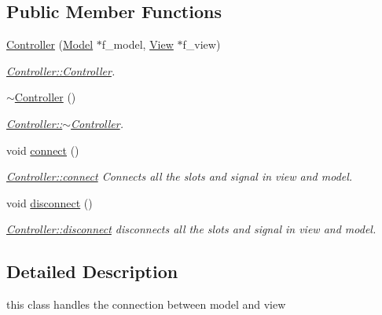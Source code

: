 \subsection*{Public Member Functions}
\begin{DoxyCompactItemize}
\item 
\hyperlink{class_controller_a7984f40669752a82c87e067bec6c3751}{Controller} (\hyperlink{class_model}{Model} $\ast$f\+\_\+model, \hyperlink{class_view}{View} $\ast$f\+\_\+view)
\begin{DoxyCompactList}\small\item\em \hyperlink{class_controller_a7984f40669752a82c87e067bec6c3751}{Controller\+::\+Controller}. \end{DoxyCompactList}\item 
\mbox{\label{class_controller_a0ab87934c4f7a266cfdb86e0f36bc1b5}} 
\hyperlink{class_controller_a0ab87934c4f7a266cfdb86e0f36bc1b5}{$\sim$\+Controller} ()
\begin{DoxyCompactList}\small\item\em \hyperlink{class_controller_a0ab87934c4f7a266cfdb86e0f36bc1b5}{Controller\+::$\sim$\+Controller}. \end{DoxyCompactList}\item 
\mbox{\label{class_controller_afe28638e4396e7b8415cbe5d05964ad2}} 
void \hyperlink{class_controller_afe28638e4396e7b8415cbe5d05964ad2}{connect} ()
\begin{DoxyCompactList}\small\item\em \hyperlink{class_controller_afe28638e4396e7b8415cbe5d05964ad2}{Controller\+::connect} Connects all the slots and signal in view and model. \end{DoxyCompactList}\item 
\mbox{\label{class_controller_a1b122dccfa346274aa2e6aa5e6a7eb01}} 
void \hyperlink{class_controller_a1b122dccfa346274aa2e6aa5e6a7eb01}{disconnect} ()
\begin{DoxyCompactList}\small\item\em \hyperlink{class_controller_a1b122dccfa346274aa2e6aa5e6a7eb01}{Controller\+::disconnect} disconnects all the slots and signal in view and model. \end{DoxyCompactList}\end{DoxyCompactItemize}


\subsection{Detailed Description}
this class handles the connection between model and view 

